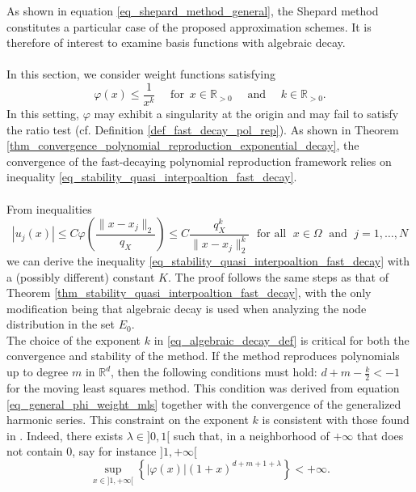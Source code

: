 \documentclass{drna}
\begin{document}
As shown in equation \eqref{eq_shepard_method_general}, the Shepard method constitutes a particular case of the proposed approximation schemes. It is therefore of interest to examine basis functions with algebraic decay.
\\
\\
In this section, we consider weight functions satisfying
\begin{equation}
    \varphi(x) \leq \frac{1}{x^k} \quad \text{ for } \, x \in \mathbb{R}_{>0} \quad \textrm{ and } \quad k \in \mathbb{R}_{>0}.
    \label{eq_algebraic_decay_def}
\end{equation}
In this setting, $\varphi$ may exhibit a singularity at the origin and may fail to satisfy the ratio test (cf. Definition \ref{def_fast_decay_pol_rep}). As shown in Theorem \ref{thm_convergence_polynomial_reproduction_exponential_decay}, the convergence of the fast-decaying polynomial reproduction framework relies on inequality \eqref{eq_stability_quasi_interpoaltion_fast_decay}.
\\
\\
From inequalities 
\begin{equation*}
    |u_j(x)| \leq C\varphi\left(\frac{\|x-x_j\|_2}{q_X}\right) \leq C \frac{q_X^k}{\|x-x_j\|_2^k} \; \text{ for all } \; x \in \Omega \; \text{ and } \; j=1,\dots,N
\end{equation*}
we can derive the inequality \eqref{eq_stability_quasi_interpoaltion_fast_decay} with a (possibly different) constant $K$. The proof follows the same steps as that of Theorem \ref{thm_stability_quasi_interpoaltion_fast_decay}, with the only modification being that algebraic decay is used when analyzing the node distribution in the set $E_0$.
\\
The choice of the exponent $k$ in \eqref{eq_algebraic_decay_def} is critical for both the convergence and stability of the method. If the method reproduces polynomials up to degree $m$ in $\mathbb{R}^d$, then the following conditions must hold: $d+m-\frac{k}{2}<-1$ for the moving least squares method.
This condition was derived from equation \eqref{eq_general_phi_weight_mls} %
together with the convergence of the generalized harmonic series. This constraint on the exponent $k$ is consistent with those found in \cite{LightCheney1992}. Indeed, there exists $\lambda \in ]0,1[$ such that, in a neighborhood of $+\infty$ that does not contain $0$,  say for instance $]1, +\infty[$
\begin{equation*}
    \sup_{x\in ]1,+ \infty[}  \left\{|\varphi(x)| (1+ x)^{d+m+1+\lambda} \right\}  < +\infty.
\end{equation*}
\end{document}
